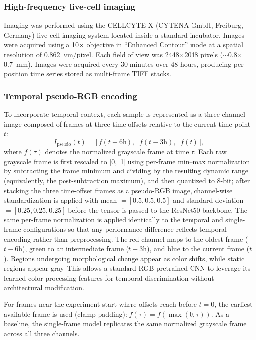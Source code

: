 \documentclass[12pt,letterpaper]{article}
\begin{document}
\subsubsection*{High-frequency live-cell imaging}

Imaging was performed using the CELLCYTE X (CYTENA GmbH, Freiburg, Germany) live-cell imaging system located inside a standard incubator.
Images were acquired using a 10$\times$ objective in ``Enhanced Contour'' mode at a spatial resolution of 0.862~$\mu$m/pixel.
Each field of view was 2448$\times$2048 pixels ($\sim$0.8$\times$0.7~mm).
Images were acquired every 30 minutes over 48 hours, producing per-position time series stored as multi-frame TIFF stacks.

\subsubsection*{Temporal pseudo-RGB encoding}

To incorporate temporal context, each sample is represented as a three-channel image composed of frames at three time offsets relative to the current time point $t$:
\[
  I_{\mathrm{pseudo}}(t) = \bigl[\,f(t{-}6\text{h}),\;\; f(t{-}3\text{h}),\;\; f(t)\,\bigr],
\]
where $f(\tau)$ denotes the normalized grayscale frame at time $\tau$.
Each raw grayscale frame is first rescaled to [0,~1] using per-frame min--max normalization by subtracting the frame minimum and dividing by the resulting dynamic range (equivalently, the post-subtraction maximum), and then quantized to 8-bit; after stacking the three time-offset frames as a pseudo-RGB image, channel-wise standardization is applied with mean $=[0.5, 0.5, 0.5]$ and standard deviation $=[0.25, 0.25, 0.25]$ before the tensor is passed to the ResNet50 backbone.
The same per-frame normalization is applied identically to the temporal and single-frame configurations so that any performance difference reflects temporal encoding rather than preprocessing.
The red channel maps to the oldest frame ($t{-}6$h), green to an intermediate frame ($t{-}3$h), and blue to the current frame ($t$).
Regions undergoing morphological change appear as color shifts, while static regions appear gray.
This allows a standard RGB-pretrained CNN to leverage its learned color-processing features for temporal discrimination without architectural modification.

For frames near the experiment start where offsets reach before $t=0$, the earliest available frame is used (clamp padding): $f(\tau) = f(\max(0, \tau))$.
As a baseline, the single-frame model replicates the same normalized grayscale frame across all three channels.
\end{document}
